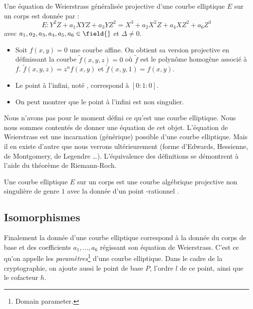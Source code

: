 \begin{definition}
Une équation de Weierstrass généralisée projective d'une courbe elliptique $E$ sur un corps \field{} est donnée par :
\begin{equation}
E : Y^2Z + a_1XYZ + a_3YZ^2 = X^3 + a_2X^2Z + a_4XZ^2 + a_6Z^3
\end{equation}
avec $a_1, a_2, a_3, a_4, a_5, a_6  \in \field{}$ et $\Delta \neq 0$.
\end{definition}

\begin{itemize}[label = --]
    \item Soit $f(x,y) = 0$ une courbe affine. On obtient sa version projective en définissant la courbe $\tilde{f}(x,y,z) = 0$ où $\tilde{f}$ est le polynôme homogène associé à $f$. $\tilde{f}(x,y,z) = z^n f(x,y)$ et $\tilde{f}(x,y,1) = f(x,y)$.
    \item Le point à l'infini, noté \infini{}, correspond à $[0 : 1 : 0]$.
    \item On peut montrer que le point à l'infini est non singulier.
\end{itemize}

\vspace{0.3cm}

Nous n'avons pas pour le moment défini ce qu'est une courbe elliptique. Nous nous sommes contentés de donner une équation de cet objet. L'équation de Weierstrass est une incarnation (générique) possible d'une courbe elliptique. Mais il en existe d'autre que nous verrons ultérieurement (forme d'Edwards, Hessienne, de Montgomery, de Legendre \ldots ). L'équivalence des définitions se démontrent à l'aide du théorème de Riemann-Roch.

\begin{definition}
Une courbe elliptique $E$ sur un corps \field{} est une courbe algébrique projective non singulière de genre $1$ avec la donnée d'un point \field{}-rationnel \infini{}.
\end{definition}

\subsection{Isomorphismes}
Finalement la donnée d'une courbe elliptique correspond à la donnée du corps de base \field{} et des coefficients $a_1, \ldots, a_6$ régissant son équation de Weierstrass. C'est ce qu'on appelle les \emph{paramètres}\footnote{Domain parameter.} d'une courbe elliptique. Dans le cadre de la cryptographie, on ajoute aussi le point de base $P$, l'ordre $l$ de ce point, ainsi que le cofacteur $h$. 

